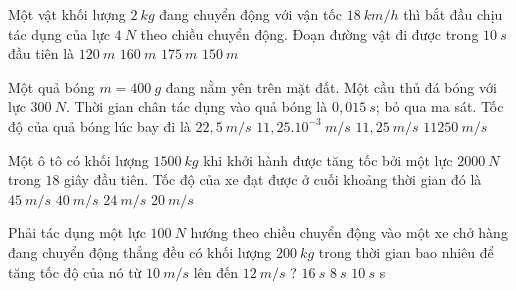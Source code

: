 \begin{ex}%
Một vật khối lượng $2\ kg$ đang chuyển động với vận tốc $18\ km/h$ thì bắt đầu chịu tác dụng của lực $4\ N$ theo chiều chuyển động. Đoạn đường vật đi được trong $10\ s$ đầu tiên là
\choice
{$120\ m$}
{$160\ m$}
{$175\ m$}
{\True $150\ m$}
  \end{ex}
\begin{ex}%
Một quả bóng ${m}=400\ g$ đang nằm yên trên mặt đất. Một cầu thủ đá bóng với lực $300\ N$. Thời gian chân tác dụng vào quả bóng là $0,015\ s$; bỏ qua ma sát. Tốc độ của quả bóng lúc bay đi là
\choice
{$22,5\ m/s$}
{$11,25.10^{-3}\ m/s$}
{\True $11,25\ m/s$}
{$11250\ m/s$}
  \end{ex}
\begin{ex}%
Một ô tô có khối lượng $1500\ kg$ khi khởi hành được tăng tốc bởi một lực $2000\ N$ trong $18$ giây đầu tiên. Tốc độ của xe đạt được ở cuối khoảng thời gian đó là
\choice
{$45\ m/s$}
{$40\ m/s$}
{\True $24\ m/s$}
{$20\ m/s$}
  \end{ex}
\begin{ex}%
Phải tác dụng một lực $100\ N$ hướng theo chiều chuyển động vào một xe chở hàng đang chuyển động thẳng đều có khối lượng $200\ kg$ trong thời gian bao nhiêu để tăng tốc độ của nó từ $10\ m/s$ lên đến $12\ m/s$ ?
\choice
{$16\ s$}
{$8\ s$}
{$10\ s$}
{ s}
  \end{ex}
